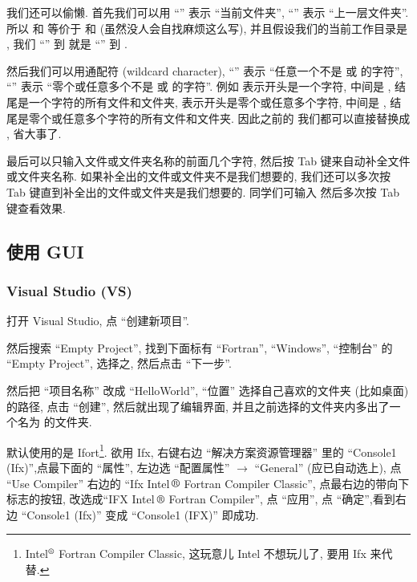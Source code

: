 我们还可以偷懒. 首先我们可以用 ``'' 表示 ``当前文件夹'', ``'' 表示 ``上一层文件夹''. 所以 和  等价于  和  (虽然没人会自找麻烦这么写), 并且假设我们的当前工作目录是 , 我们 ``'' 到  就是 ``'' 到 .

然后我们可以用通配符 (wildcard character), ``'' 表示 ``任意一个不是  或 \ttt{\bs{}} 的字符'', ``\ttt{*}'' 表示 ``零个或任意多个不是  或 \ttt{\bs{}} 的字符''. 例如  表示开头是一个字符, 中间是 , 结尾是一个字符的所有文件和文件夹,  表示开头是零个或任意多个字符, 中间是 , 结尾是零个或任意多个字符的所有文件和文件夹. 因此之前的  我们都可以直接替换成 , 省大事了.

最后可以只输入文件或文件夹名称的前面几个字符, 然后按 Tab 键来自动补全文件或文件夹名称. 如果补全出的文件或文件夹不是我们想要的, 我们还可以多次按 Tab 键直到补全出的文件或文件夹是我们想要的. 同学们可输入  然后多次按 Tab 键查看效果. 

\subsection{使用 GUI}

\subsubsection{Visual Studio (VS)}

打开 Visual Studio, 点 ``创建新项目''.

然后搜索 ``Empty Project'', 找到下面标有 ``Fortran'', ``Windows'', ``控制台'' 的 ``Empty Project'', 选择之, 然后点击 ``下一步''.

然后把 ``项目名称'' 改成 ``HelloWorld'', ``位置'' 选择自己喜欢的文件夹 (比如桌面) 的路径, 点击 ``创建'', 然后就出现了编辑界面, 并且之前选择的文件夹内多出了一个名为  的文件夹.

默认使用的是 Ifort\footnote{Intel${}^\r$ Fortran Compiler Classic, 这玩意儿 Intel 不想玩儿了, 要用 Ifx 来代替.}. 欲用 Ifx, 右键右边 ``解决方案资源管理器'' 里的 ``Console1 (Ifx)'',点最下面的 ``属性'', 左边选 ``配置属性'' $\rightarrow$ ``General'' (应已自动选上), 点 ``Use Compiler'' 右边的 ``Ifx Intel$\,\r$ Fortran Compiler Classic'', 点最右边的带向下标志的按钮, 改选成``IFX Intel$\,\r$ Fortran Compiler'', 点 ``应用'', 点 ``确定'',看到右边 ``Console1 (Ifx)'' 变成 ``Console1 (IFX)'' 即成功.

